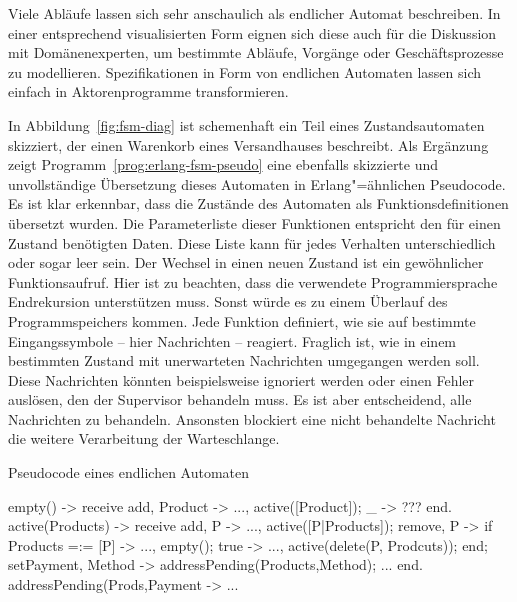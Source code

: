 Viele Abläufe lassen sich sehr anschaulich als endlicher Automat beschreiben. In einer entsprechend visualisierten Form eignen sich diese auch für die Diskussion mit Domänenexperten, um bestimmte Abläufe, Vorgänge oder Geschäftsprozesse zu modellieren. Spezifikationen in Form von endlichen Automaten lassen sich einfach in Aktorenprogramme transformieren.

In Abbildung~\ref{fig:fsm-diag} ist schemenhaft ein Teil eines Zustandsautomaten skizziert, der einen Warenkorb eines Versandhauses beschreibt. Als Ergänzung zeigt Programm~\ref{prog:erlang-fsm-pseudo} eine ebenfalls skizzierte und unvollständige Übersetzung dieses Automaten in Erlang"=ähnlichen Pseudocode. Es ist klar erkennbar, dass die Zustände des Automaten als Funktionsdefinitionen übersetzt wurden. Die Parameterliste dieser Funktionen entspricht den für einen Zustand benötigten Daten. Diese Liste kann für jedes Verhalten unterschiedlich oder sogar leer sein. Der Wechsel in einen neuen Zustand ist ein gewöhnlicher Funktionsaufruf. Hier ist zu beachten, dass die verwendete Programmiersprache Endrekursion unterstützen muss. Sonst würde es zu einem Überlauf des Programmspeichers kommen. Jede Funktion definiert, wie sie auf bestimmte Eingangssymbole -- hier Nachrichten --  reagiert. Fraglich ist, wie in einem bestimmten Zustand mit unerwarteten Nachrichten umgegangen werden soll. Diese Nachrichten könnten beispielsweise ignoriert werden oder einen Fehler auslösen, den der Supervisor behandeln muss. Es ist aber entscheidend, alle Nachrichten zu behandeln. Ansonsten blockiert eine nicht behandelte Nachricht die weitere Verarbeitung der Warteschlange.

\begin{program}[!hbt]
\caption{Pseudocode eines endlichen Automaten}
\label{prog:erlang-fsm-pseudo}
\begin{ErlangCode}
empty() ->
	receive
		{ add, Product } -> ..., active([Product]);
		_ -> ??? %
	end.
active(Products) ->
	receive
		{ add, P } -> ..., active([P|Products]);
		{ remove, P } -> if Products =:= [P] -> ..., empty();
												true -> ..., active(delete(P, Prodcuts));
										 end;
		{ setPayment, Method } -> addressPending({Products,Method});
		...
	end.
addressPending({Prods,Payment} -> ...
\end{ErlangCode}
\end{program}

